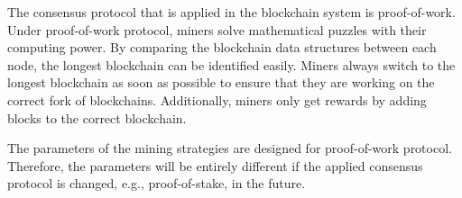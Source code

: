 The consensus protocol that is applied in the blockchain system is proof-of-work. Under proof-of-work protocol, miners solve mathematical puzzles with their computing power. By comparing the blockchain data structures between each node, the longest blockchain can be identified easily. Miners always switch to the longest blockchain as soon as possible to ensure that they are working on the correct fork of blockchains. Additionally, miners only get rewards by adding blocks to the correct blockchain.

The parameters of the mining strategies are designed for proof-of-work protocol. Therefore, the parameters will be entirely different if the applied consensus protocol is changed, e.g., proof-of-stake, in the future.